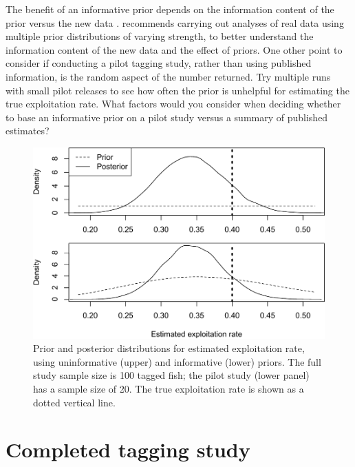 \documentclass[
]{krantz}
\begin{document}
The benefit of an informative prior depends on the information content of the prior versus the new data \citep{mccarthy.masters_2005}. \citet{lemoine_2019} recommends carrying out analyses of real data using multiple prior distributions of varying strength, to better understand the information content of the new data and the effect of priors. One other point to consider if conducting a pilot tagging study, rather than using published information, is the random aspect of the number returned. Try multiple runs with small pilot releases to see how often the prior is unhelpful for estimating the true exploitation rate. What factors would you consider when deciding whether to base an informative prior on a pilot study versus a summary of published estimates?

\begin{figure}
\includegraphics[width=0.9\linewidth]{bookdown_files/figure-latex/InfPriorPlot-1} \caption{Prior and posterior distributions for estimated exploitation rate, using uninformative (upper) and informative (lower) priors. The full study sample size is 100 tagged fish; the pilot study (lower panel) has a sample size of 20. The true exploitation rate is shown as a dotted vertical line.}\label{fig:InfPriorPlot}
\end{figure}

\hypertarget{Hearn}{%
\section{Completed tagging study}\label{Hearn}}
\end{document}
